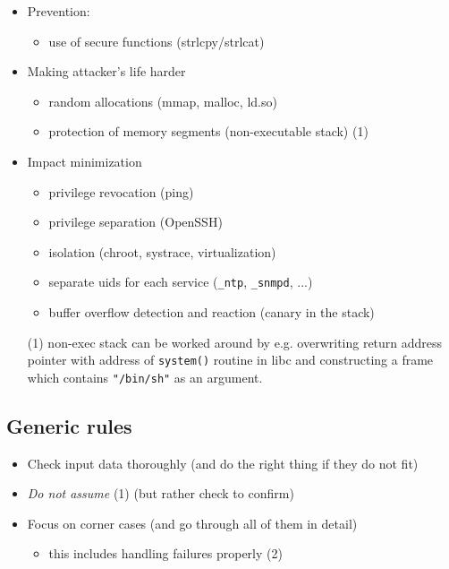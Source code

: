 \begin{itemize}
  \item Prevention: 
  \begin{itemize}
    \item use of secure functions (strlcpy/strlcat)
  \end{itemize}
  \item Making attacker's life harder
  \begin{itemize}
    \item random allocations (mmap, malloc, ld.so)
    \item protection of memory segments (non-executable stack) (1)
  \end{itemize}
  \item Impact minimization
  \begin{itemize}
    \item privilege revocation (ping)
    \item privilege separation (OpenSSH)
    \item isolation (chroot, systrace, virtualization)
    \item separate uids for each service (\texttt{\_ntp}, \texttt{\_snmpd}, ...)
    \item buffer overflow detection and reaction (canary in the stack)
  \end{itemize}
\end{itemize}


\begin{itemize}
\item[(1)] non-exec stack can be worked around by e.g. overwriting return
address pointer with address of \texttt{system()} routine in libc and
constructing a frame which contains \texttt{"/bin/sh"} as an argument.
\end{itemize}


\subsection{Generic rules}

\begin{itemize}
  \item Check input data thoroughly (and do the right thing if they do not fit)
  \item {\it Do not assume} (1) (but rather check to confirm)
  \item Focus on corner cases (and go through all of them in detail)
  \begin{itemize}
    \item this includes handling failures properly (2)
  \end{itemize}
\end{itemize}


